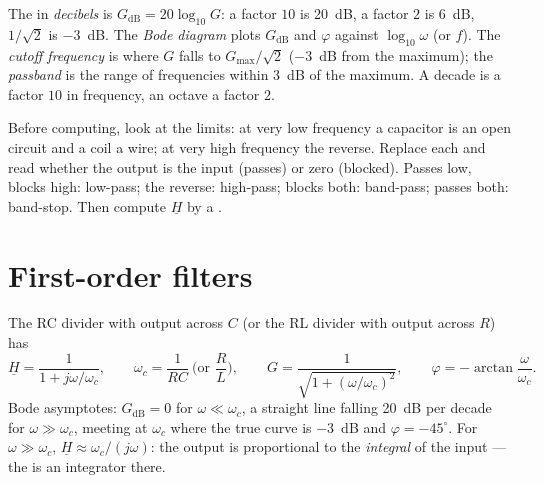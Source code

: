 \begin{definition}\label{def:b1:filters-transfer-functions:bode}
The  in \emph{decibels} is $G_{\mathrm{dB}} = 20\log_{10}G$: a factor
$10$ is \qty{20}{dB}, a factor $2$ is \qty{6}{dB}, $1/\sqrt2$ is
\qty{-3}{dB}. The \emph{Bode diagram} plots $G_{\mathrm{dB}}$ and
$\varphi$ against $\log_{10}\omega$ (or $f$). The \emph{cutoff
frequency} is where $G$ falls to $G_{\max}/\sqrt2$ (\qty{-3}{dB} from
the maximum); the \emph{passband} is the range of frequencies within
\qty{3}{dB} of the maximum. A decade is a factor $10$ in frequency, an
octave a factor $2$.
\end{definition}

\begin{method}\label{met:b1:filters-transfer-functions:nature}
Before computing, look at the limits: at very low frequency a capacitor
is an open circuit and a coil a wire; at very high frequency the
reverse. Replace each and read whether the output is the input
(passes) or zero (blocked). Passes low, blocks high: low-pass; the
reverse: high-pass; blocks both: band-pass; passes both: band-stop.
Then compute $\underline H$ by a .
\end{method}

\section{First-order filters}

\begin{proposition}\label{prop:b1:filters-transfer-functions:lowpass1}
The RC divider with output across $C$ (or the RL divider with output
across $R$) has
\[
\underline H = \frac{1}{1 + j\omega/\omega_c}, \qquad
\omega_c = \frac{1}{RC} \ \Big(\text{or } \frac{R}{L}\Big),
\qquad G = \frac{1}{\sqrt{1 + (\omega/\omega_c)^2}}, \qquad
\varphi = -\arctan\frac{\omega}{\omega_c} .
\]
Bode asymptotes: $G_{\mathrm{dB}} = 0$ for $\omega \ll \omega_c$, a
straight line falling \qty{20}{dB} per decade for $\omega \gg \omega_c$,
meeting at $\omega_c$ where the true curve is \qty{-3}{dB} and
$\varphi = -45^\circ$. For $\omega \gg \omega_c$, $\underline H \approx
\omega_c/(j\omega)$: the output is proportional to the \emph{integral}
of the input --- the  is an integrator there.
\end{proposition}

